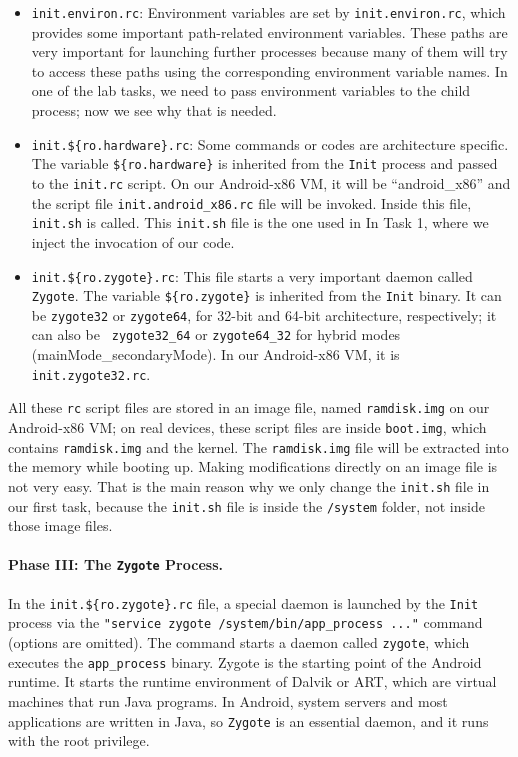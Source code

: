 \begin{itemize}
  \item \texttt{init.environ.rc}: Environment variables are set by \texttt{init.environ.rc},
    which provides some important path-related environment variables.  These paths are very
    important for launching further processes because many of them will try to access these
    paths using the corresponding environment variable names. In one
    of the lab tasks, we need to pass environment variables to the child process; now we see
    why that is needed.  

  \item \texttt{init.\$\{ro.hardware\}.rc}: Some commands or codes are architecture specific.
    The variable \texttt{\$\{ro.hardware\}} is inherited from the \texttt{Init} process and passed to 
    the \texttt{init.rc} script. On our Android-x86 VM, it will be ``android\_x86'' and the
    script file \texttt{init.android\_x86.rc} file will be invoked. 
    Inside this file, \texttt{init.sh} is called. This \texttt{init.sh} file
    is the one used in In Task 1, where we inject the invocation of our code.

  \item \texttt{init.\$\{ro.zygote\}.rc}: This file starts a very important daemon called
    \texttt{Zygote}.  The variable \texttt{\$\{ro.zygote\}} is inherited
    from the \texttt{Init} binary. It can be \texttt{zygote32} or \texttt{zygote64}, for 32-bit
    and 64-bit architecture, respectively; it can also be \texttt{ zygote32\_64} or \texttt{zygote64\_32} 
    for hybrid modes (mainMode\_secondaryMode).  In our Android-x86 VM, 
    it is \texttt{init.zygote32.rc}.  
    
    
\end{itemize}


All these \texttt{rc} script files are stored in an image file, named \texttt{ramdisk.img}
on our Android-x86 VM; on real devices, these script files are inside \texttt{boot.img}, 
which contains \texttt{ramdisk.img} and the kernel.
The \texttt{ramdisk.img} file will be extracted into the memory while booting
up. Making modifications directly on an image file is not very easy. That is the main reason
why we only change the \texttt{init.sh} file in our first task, because  
the \texttt{init.sh} file is inside the \texttt{/system} folder, not inside 
those image files. 


\paragraph{Phase III: The \texttt{Zygote} Process.}
In the \texttt{init.\$\{ro.zygote\}.rc} file, a special daemon is launched by the \texttt{Init}
process via the \texttt{"service zygote /system/bin/app\_process ..."} command (options are
omitted). The command starts a daemon called \texttt{zygote}, which executes 
the \texttt{app\_process} binary.
Zygote is the starting point of the Android runtime.
It starts the runtime environment of Dalvik or ART, which are virtual machines that run Java programs. 
In Android, system servers and most applications are written in Java, so \texttt{Zygote} is
an essential daemon, and it runs with the root privilege. 

